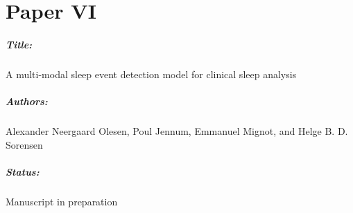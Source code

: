 \chapter{Paper VI}

\paragraph{Title:}
A multi-modal sleep event detection model for clinical sleep analysis

\paragraph{Authors:}
Alexander Neergaard Olesen, Poul Jennum, Emmanuel Mignot, and Helge B. D. Sorensen

\paragraph{Status:}
Manuscript in preparation



